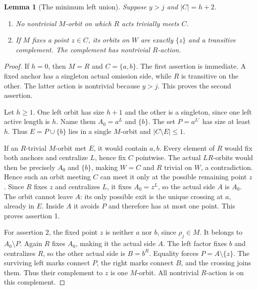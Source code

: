 \documentclass[11pt,a4paper]{article}
\newtheorem{lemma}{Lemma}
\begin{document}
\begin{lemma}[The minimum left union]
Suppose $y>j$ and $|C|=h+2$.
\begin{enumerate}
\item No nontrivial $M$-orbit on which $R$ acts trivially
      meets $C$.
\item If $M$ fixes a point $z\in C$, its orbits on $W$
      are exactly $\{z\}$ and a transitive complement.
      The complement has nontrivial $R$-action.
\end{enumerate}
\end{lemma}
\begin{proof}
If $h=0$, then $M=R$ and $C=\{a,b\}$. The first assertion
is immediate. A fixed anchor has a singleton actual omission
side, while $R$ is transitive on the other. The latter action
is nontrivial because $y>j$. This proves the second assertion.

Let $h\ge1$. One left orbit has size $h+1$ and the other
is a singleton, since one left active length is $h$.
Name them $A_0=a^L$ and $\{b\}$. The set
$P=a^{L'}$ has size at least $h$. Thus
$E=P\cup\{b\}$ lies in a single $M$-orbit and
$|C\setminus E|\le1$.

If an $R$-trivial $M$-orbit met $E$, it would contain
$a,b$. Every element of $R$ would fix both anchors
and centralize $L$, hence fix $C$ pointwise. The
actual $LR$-orbits would then be precisely $A_0$
and $\{b\}$, making $W=C$ and $R$ trivial on $W$,
a contradiction. Hence such an orbit meeting $C$
can meet it only at the possible remaining point $z$.
Since $R$ fixes $z$ and centralizes $L$, it fixes
$A_0=z^L$, so the actual side $A$ is $A_0$.
The orbit cannot leave $A$: its only possible exit
is the unique crossing at $a$, already in $E$.
Inside $A$ it avoids $P$ and therefore has at most
one point. This proves assertion 1.

For assertion 2, the fixed point $z$ is neither
$a$ nor $b$, since $\rho_j\in M$. It belongs to
$A_0\setminus P$. Again $R$ fixes $A_0$, making
it the actual side $A$. The left factor fixes
$b$ and centralizes $R$, so the other actual side
is $B=b^R$. Equality forces $P=A\setminus\{z\}$.
The surviving left marks connect $P$, the right
marks connect $B$, and the crossing joins them.
Thus their complement to $z$ is one $M$-orbit.
All nontrivial $R$-action is on this complement.
\end{proof}
\end{document}
